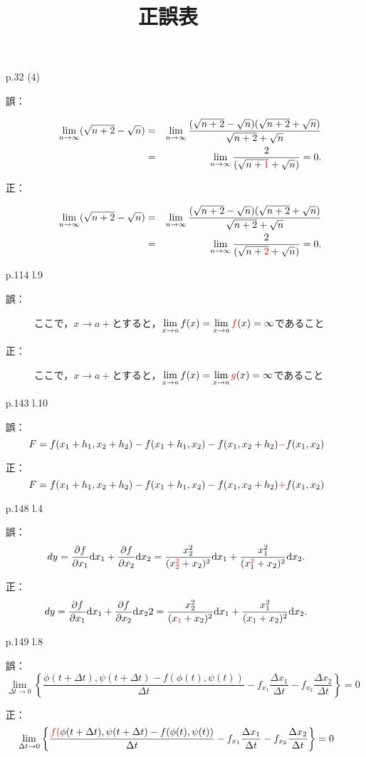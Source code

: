 \documentclass[pdflatex,ja=standard,a4paper]{bxjsarticle}
\title{正誤表}
\author{}
\newcommand{\dif}{\mathrm{d}}
\begin{document}
\maketitle


\begin{enumerate}
\item[p.32 (4)]\quad 
\begin{description}
\item[誤：] 
\begin{eqnarray*}
			\lim_{n\to\infty}(\sqrt{n+2}-\sqrt{n})
			&=& \lim_{n\to\infty}
			\frac{(\sqrt{n+2}-\sqrt{n})(\sqrt{n+2}+\sqrt{n})}{\sqrt{n+2}+\sqrt{n}}\\
			&=& \lim_{n\to\infty}
			\frac{2}{(\sqrt{n+\textcolor{red}{1}}+\sqrt{n})}=0.
\end{eqnarray*}
\item[正：] 
\begin{eqnarray*}
			\lim_{n\to\infty}(\sqrt{n+2}-\sqrt{n})
			&=& \lim_{n\to\infty}
			\frac{(\sqrt{n+2}-\sqrt{n})(\sqrt{n+2}+\sqrt{n})}{\sqrt{n+2}+\sqrt{n}}\\
		&=& \lim_{n\to\infty}
		\frac{2}{(\sqrt{n+\textcolor{red}{2}}+\sqrt{n})}=0.
\end{eqnarray*}
\end{description}
\item[p.114 l.9]\quad 
\begin{description}
\item[誤：] 
ここで，$x\to a+$とすると，${\displaystyle\lim_{x\to a}f(x)=\lim_{x\to a}\textcolor{red}{f}(x)=\infty}$であること
\item[正：] 
ここで，$x\to a+$とすると，${\displaystyle\lim_{x\to a}f(x)=\lim_{x\to a}\textcolor{red}{g}(x)=\infty}$であること
\end{description}
\item[p.143 l.10]
\item[誤：] 
$$F=f(x_1+h_1,x_2+h_2)-f(x_1+h_1,x_2)-f(x_1,x_2+h_2)\textcolor{red}{-}f(x_1,x_2)$$
\item[正：] 
$$F=f(x_1+h_1,x_2+h_2)-f(x_1+h_1,x_2)-f(x_1,x_2+h_2)\textcolor{red}{+}f(x_1,x_2)$$

\item[p.148 l.4]
\item[誤：] 
$$dy=\frac{\partial f}{\partial x_1}\dif x_1+\frac{\partial f}{\partial x_2}\dif x_2=
\frac{x_2^2}{(x_{\textcolor{red}{2}}^{\textcolor{red}{2}}+x_2)^2}\dif x_1+
\frac{x_1^2}{(x_1^{\textcolor{red}{2}}+x_2)^2}\dif x_2.$$
\item[正：] 
$$dy=\frac{\partial f}{\partial x_1}\dif x_1+\frac{\partial f}{\partial x_2}\dif x_2
2=
\frac{x_2^2}{(x_{\textcolor{red}{1}}+x_2)^2}\dif x_1+
\frac{x_1^2}{(x_1+x_2)^2}\dif x_2.$$
\item[p.149 l.8]
\item[誤：] 
$$\lim_{\Delta t\to0}
\left\{
\frac{\phi(t+\Delta t),\psi(t+\Delta t)-f(\phi(t),\psi(t))}{\Delta t}-f_{x_1}\frac{\Delta x_1}{\Delta t}-f_{x_2}\frac{\Delta x_2}{\Delta t}
\right\}=0$$
\item[正：] 
$$\lim_{\Delta t\to0}
\left\{
\frac{\textcolor{red}{f(}\phi(t+\Delta t),\psi(t+\Delta t)-f(\phi(t),\psi(t))}{\Delta t}-f_{x_1}\frac{\Delta x_1}{\Delta t}-f_{x_2}\frac{\Delta x_2}{\Delta t}
\right\}=0$$
\end{enumerate}
\end{document}
